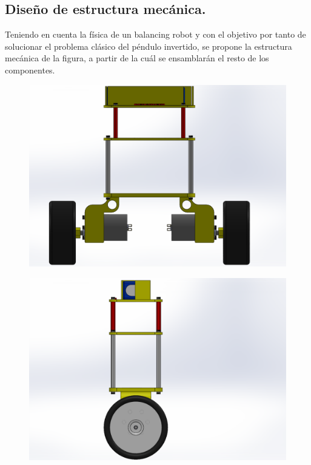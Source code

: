 \subsection{Diseño de estructura mecánica.}
Teniendo en cuenta la física de un balancing robot y con el objetivo por tanto de solucionar el problema clásico del péndulo invertido, se propone la estructura mecánica de la figura, a partir de la cuál se ensamblarán el resto de los componentes.

\begin{center}
	\begin{figure}[H]
		\center
		\includegraphics[trim = 0mm 0mm 40mm 0mm,clip, angle=0, scale = 1]{imagenes/Balancing_Robot/EnsanBalanceFront.PDF}
		\label{fig:diagramaGantt}
	\end{figure}
\end{center}

\begin{center}
	\begin{figure}[H]
		\center
		\includegraphics[trim = 0mm 0mm 0mm 0mm,clip, angle=0, scale = 1]{imagenes/Balancing_Robot/EnsanBalanceLateral.PDF}
		\label{fig:diagramaGantt}
	\end{figure}
\end{center}

